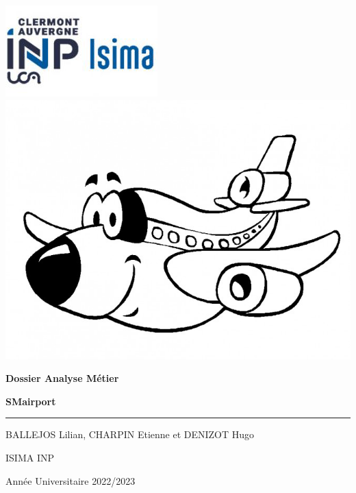 \documentclass[12pt,french]{article} %
\begin{document}
\begin{titlepage} %

  
  \includegraphics[scale=0.6]{isima.png}
  \includegraphics[scale=0.2]{deco.jpg}
  
  \vspace*{2.5cm} %
  
  \begin{center}\huge
    \textbf{Dossier Analyse Métier} 
    
    \textbf{SMairport}
  \end{center}
  
  \hrule %
  
  \begin{center}
    \Large BALLEJOS Lilian,
    \Large CHARPIN Etienne et
    \Large DENIZOT Hugo
    
    \large
    
    ISIMA INP
  
    Année Universitaire 2022/2023
  \end{center}
  
  \begin{center}
  \end{center}
  

\end{titlepage}
\end{document}
